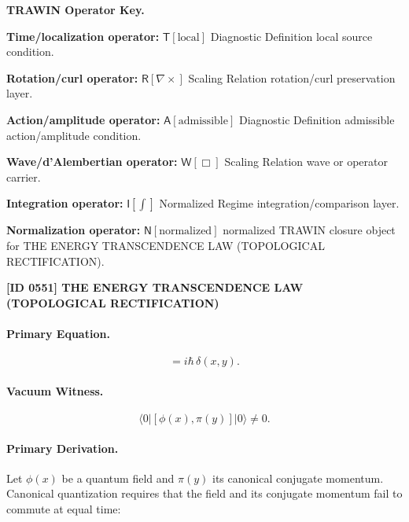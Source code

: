 \par\vspace{0.45\baselineskip}
\noindent\begin{minipage}[t]{\linewidth}
\begingroup
\small
\raggedright
\textbf{TRAWIN Operator Key.}\par
\noindent\textbf{Time/localization operator:} $\mathsf{T}\!\left[\mathrm{local}\right]$ Diagnostic Definition local source condition.\par
\noindent\textbf{Rotation/curl operator:} $\mathsf{R}\!\left[\nabla\times\right]$ Scaling Relation rotation/curl preservation layer.\par
\noindent\textbf{Action/amplitude operator:} $\mathsf{A}\!\left[\mathrm{admissible}\right]$ Diagnostic Definition admissible action/amplitude condition.\par
\noindent\textbf{Wave/d'Alembertian operator:} $\mathsf{W}\!\left[\Box\right]$ Scaling Relation wave or operator carrier.\par
\noindent\textbf{Integration operator:} $\mathsf{I}\!\left[\int\right]$ Normalized Regime integration/comparison layer.\par
\noindent\textbf{Normalization operator:} $\mathsf{N}\!\left[\mathrm{normalized}\right]$ normalized TRAWIN closure object for THE ENERGY TRANSCENDENCE LAW (TOPOLOGICAL RECTIFICATION).\par
\endgroup
\end{minipage}

\clearpage
\noindent\textbf{[ID 0551] THE ENERGY TRANSCENDENCE LAW (TOPOLOGICAL RECTIFICATION)}\par
\vspace{0.35em}
\paragraph{Primary Equation.}
\begin{equation}
[\phi(x),\pi(y)] = i\hbar\,\delta(x,y).
\end{equation}

\paragraph{Vacuum Witness.}
\begin{equation}
\langle 0|[\phi(x),\pi(y)]|0\rangle \neq 0 .
\end{equation}

\paragraph{Primary Derivation.}
Let $\phi(x)$ be a quantum field and $\pi(y)$ its canonical conjugate momentum.  
Canonical quantization requires that the field and its conjugate momentum fail to commute at equal time:

